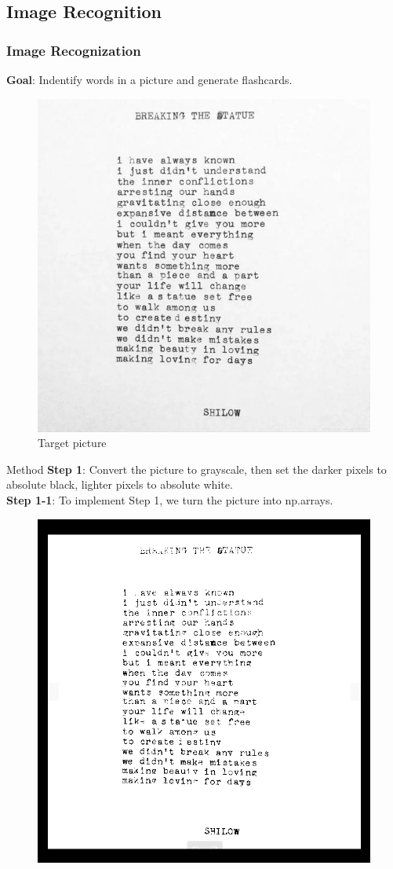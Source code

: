 \documentclass{beamer}
\begin{document}
\subsection{Image Recognition}%
\label{sub:image_recognition}



\begin{frame}
	\frametitle{Image Recognization}
	\textbf{Goal}: Indentify words in a picture and generate flashcards.
	\begin{figure}[h]
		\centering
		\includegraphics[width=0.55\linewidth]{./img1.jpg}
		\caption{Target picture}
	\end{figure}
\end{frame}

\begin{frame}{Method}
		\textbf{Step 1}: Convert the picture to grayscale, then set the darker pixels to absolute black, lighter pixels to absolute white.\\
		\textbf{Step 1-1}: To implement Step 1, we turn the picture into np.arrays.
		\begin{figure}[h]
			\centering
			\includegraphics[width=0.50\linewidth]{./picture_blackwhite.png}
		\end{figure}
\end{frame}
\end{document}
